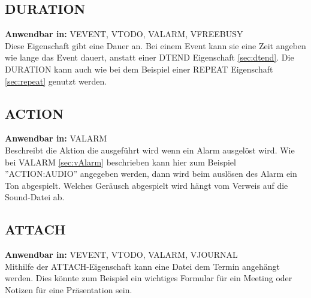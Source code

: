 \subsection{DURATION}
\label{sec:duration}
\textbf{Anwendbar in:} VEVENT, VTODO, VALARM, VFREEBUSY\\
Diese Eigenschaft gibt eine Dauer an. Bei einem Event kann sie eine Zeit angeben wie lange das Event dauert, anstatt einer DTEND Eigenschaft \ref{sec:dtend}. Die DURATION kann auch wie bei dem Beispiel einer REPEAT Eigenschaft \ref{sec:repeat} genutzt werden.
\subsection{ACTION}
\label{sec:action}
\textbf{Anwendbar in:} VALARM \\
Beschreibt die Aktion die ausgeführt wird wenn ein Alarm ausgelöst wird. Wie bei VALARM \ref{sec:vAlarm} beschrieben kann hier zum Beispiel ''ACTION:AUDIO'' angegeben werden, dann wird beim auslösen des Alarm ein Ton abgespielt. Welches Geräusch abgespielt wird hängt vom Verweis auf die Sound-Datei ab. 
\subsection{ATTACH}
\label{sec:attach}
\textbf{Anwendbar in:} VEVENT, VTODO, VALARM, VJOURNAL\\
Mithilfe der ATTACH-Eigenschaft kann eine Datei dem Termin angehängt werden. Dies könnte zum Beispiel ein wichtiges Formular für ein Meeting oder Notizen für eine Präsentation sein. 
\pagebreak